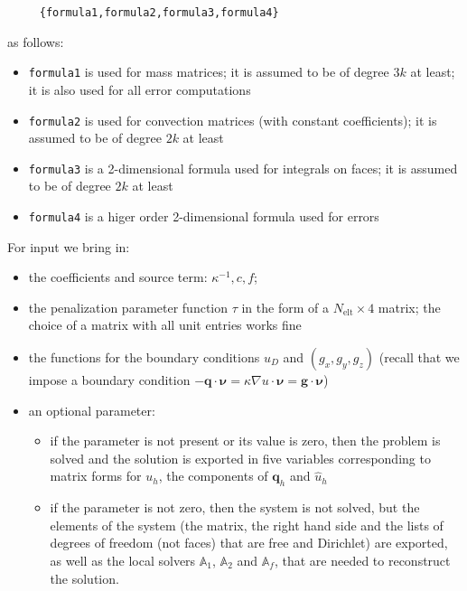 \documentclass[10pt,english]{article}
\newcommand{\Nelt}{{N_{\mathrm{elt}}}}
\begin{document}
\begin{verbatim}
     {formula1,formula2,formula3,formula4}
\end{verbatim}

as follows:
\begin{itemize}
\item {\tt formula1} is used for mass matrices; it is assumed to be of degree $3k$ at least; it is also used for all error computations
\item {\tt formula2} is used for convection matrices (with constant coefficients); it is assumed to be of degree $2k$ at least
\item {\tt formula3} is a 2-dimensional formula used for integrals on faces; it is assumed to be of degree $2k$ at least
\item {\tt formula4} is a higer order 2-dimensional formula used for errors
\end{itemize}
For input we bring in:
\begin{itemize}
\item the coefficients and source term: $\kappa^{-1}, c, f$;
\item the penalization parameter function $\tau$ in the form of a $\Nelt\times 4$ matrix; the choice of a matrix with all unit entries works fine
\item the functions for the boundary conditions $u_D$ and $(g_x,g_y,g_z)$ (recall that we impose a boundary condition $-\boldsymbol q\cdot\boldsymbol\nu=\kappa\nabla u\cdot\boldsymbol\nu=\boldsymbol g\cdot\boldsymbol\nu$)
\item an optional parameter:
\begin{itemize}
\item if the parameter is not present or its value is zero, then the problem is solved and the solution is exported in five variables corresponding to matrix forms for $u_h$, the components of $\boldsymbol q_h$ and $\widehat u_h$
\item if the parameter is not zero, then the system is not solved, but the elements of the system (the matrix, the right hand side and the lists of degrees of freedom (not faces) that are free and Dirichlet) are exported, as well as the local solvers $\mathbb A_1$, $\mathbb A_2$ and $\mathbb A_f$, that are needed to reconstruct the solution.
\end{itemize}
\end{itemize}



\end{document}
